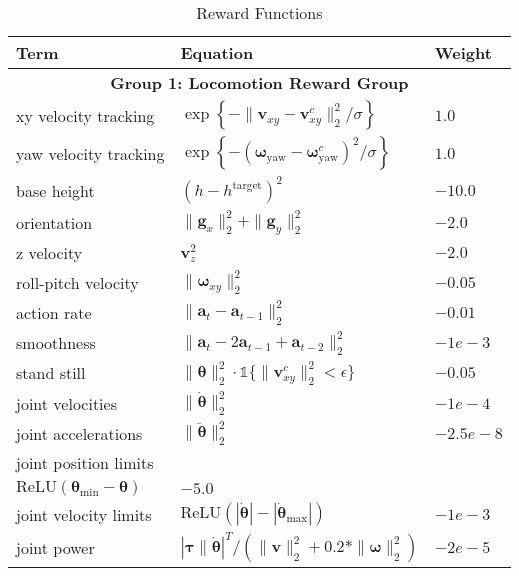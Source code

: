 \begin{table}[h]
    \centering
    \caption{Reward Functions}
    \begin{tabular}{lll}
    \toprule[1.0pt]
    \textbf{Term} & \textbf{Equation} & \textbf{Weight} \\
    
    \midrule[0.8pt]
    \multicolumn{3}{c}{\textbf{Group 1: Locomotion Reward Group}} \\ [0.2ex]
    xy velocity tracking & $\exp \left\{- {\|\mathbf{v}_{x y}-\mathbf{v}_{x y}^c\|_2^2}/{\sigma}  \right\}$ & $1.0$ \\
    yaw velocity tracking & $\exp \left\{- {\left(\boldsymbol{\omega}_{\text {yaw}}-\boldsymbol{\omega}_{\text {yaw}}^c\right)^2}/{\sigma} \right\}$ & $1.0$ \\
    
    base height & $\left(h - h^{\text {target}}\right)^2$ & $-10.0$ \\ [0.2ex]
    orientation & $\|\mathbf{g}_{x}\|_2^2 + \|\mathbf{g}_{y}\|_2^2$ & $-2.0$ \\ [0.2ex]
    z velocity & $\mathbf{v}_z^2$ & $-2.0$ \\ [0.2ex]
    roll-pitch velocity & $\|\boldsymbol{\omega}_{x y}\|_2^2$ & $-0.05$ \\ [0.2ex]
    action rate & $\|\mathbf{a}_t-\mathbf{a}_{t-1}\|_2^2$ & $-0.01$ \\ [0.2ex]
    smoothness & $\|\mathbf{a}_t-2 \mathbf{a}_{t-1}+\mathbf{a}_{t-2}\|_2^2$ & $-1e-3$ \\ [0.2ex]
    stand still & $\|{\boldsymbol{\theta}}\|_{2}^{2} \cdot \mathds{1}\{ \| \mathbf{v}_{x y}^c \|_2^2 < \epsilon \}$ & $-0.05$  \\ [0.2ex]
    
    joint velocities & $\|\dot{\boldsymbol{\theta}}\|_{2}^{2}$ & $-1e-4$ \\ [0.2ex]
    joint accelerations & $\|\ddot{\boldsymbol{\theta}}\|_2^2$ & $-2.5e-8$ \\ [0.2ex]
    joint position limits & \makecell[l]{
        $\text{ReLU}({\boldsymbol\theta} - {\boldsymbol\theta}_\text{max}) +$ \\
        \quad \quad \quad $\text{ReLU}({\boldsymbol\theta_\text{min}} - {\boldsymbol\theta})$
    } & $-5.0$ \\ [1.5ex]
    joint velocity limits & $\text{ReLU}(|\dot{\boldsymbol\theta}| - |\dot{\boldsymbol\theta}_\text{max}|)$ & $-1e-3$ \\ [0.2ex]
    joint power & ${|\boldsymbol{\tau} \| \dot{\boldsymbol{\theta}}|^{T}}/\left( \|\mathbf{v}\|_2^2 + 0.2 * \|\boldsymbol{\omega}\|_2^2 \right)$ & $-2e-5$ \\ [0.2ex]
    

\end{tabular}
\end{table}
